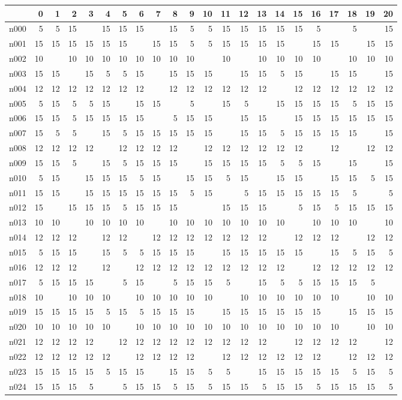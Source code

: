 {\scriptsize
\begin{tabular}{l*{21}{r}} \toprule
& 0& 1& 2& 3& 4& 5& 6& 7& 8& 9& 10& 11& 12& 13& 14& 15& 16& 17& 18& 19& 20\\ \midrule 
n000& 5& 5& 15& & 15& 15& 15& & 15& 5& 5& 15& 15& 15& 15& 15& 5& & 5& & 15\\ 
n001& 15& 15& 15& 15& 15& 15& & 15& 15& 5& 5& 15& 15& 15& 15& & 15& 15& & 15& 15\\ 
n002& 10& & 10& 10& 10& 10& 10& 10& 10& 10& & 10& & 10& 10& 10& 10& & 10& 10& 10\\ 
n003& 15& 15& & 15& 5& 5& 15& & 15& 15& 15& & 15& 15& 5& 15& & 15& 15& & 15\\ 
n004& 12& 12& 12& 12& 12& 12& 12& & 12& 12& 12& 12& 12& 12& & 12& 12& 12& 12& 12& 12\\ 
n005& 5& 15& 5& 5& 15& & 15& 15& & 5& & 15& 5& & 15& 15& 15& 15& 5& 15& 15\\ 
n006& 15& 15& 5& 15& 15& 15& 15& & 5& 15& 15& & 15& 15& & 15& 15& 15& 15& 15& 15\\ 
n007& 15& 5& 5& & 15& 5& 15& 15& 15& 15& 15& & 15& 15& 5& 15& 15& 15& 15& & 15\\ 
n008& 12& 12& 12& 12& & 12& 12& 12& 12& & 12& 12& 12& 12& 12& 12& & 12& & 12& 12\\ 
n009& 15& 15& 5& & 15& 5& 15& 15& 15& & 15& 15& 15& 15& 5& 5& 15& & 15& & 15\\ 
n010& 5& 15& & 15& 15& 15& 5& 15& & 15& 15& 5& 15& & 15& 15& & 15& 15& 5& 15\\ 
n011& 15& 15& & 15& 15& 15& 15& 15& 15& 5& 15& & 5& 15& 15& 15& 15& 15& 5& & 5\\ 
n012& 15& & 15& 15& 15& 5& 15& 15& 15& & & 15& 15& 15& & 5& 15& 5& 15& 15& 15\\ 
n013& 10& 10& & 10& 10& 10& 10& & 10& 10& 10& 10& 10& 10& 10& & 10& 10& 10& & 10\\ 
n014& 12& 12& 12& & 12& 12& & 12& 12& 12& 12& 12& 12& 12& & 12& 12& 12& & 12& 12\\ 
n015& 5& 15& 15& & 15& 5& 5& 15& 15& 15& & 15& 15& 15& 15& 15& & 15& 5& 15& 5\\ 
n016& 12& 12& 12& & 12& & 12& 12& 12& 12& 12& 12& 12& 12& 12& & 12& 12& 12& 12& 12\\ 
n017& 5& 15& 15& 15& & 5& 15& & 5& 15& 15& 5& & 15& 5& 5& 15& 15& 15& 5& \\ 
n018& 10& & 10& 10& 10& & 10& 10& 10& 10& 10& & 10& 10& 10& 10& 10& 10& & 10& 10\\ 
n019& 15& 15& 15& 15& 5& 15& 5& 15& 15& 15& & 15& 15& 15& 15& 15& 15& & 15& 15& 15\\ 
n020& 10& 10& 10& 10& 10& & 10& 10& 10& 10& 10& 10& 10& 10& 10& 10& 10& 10& & 10& 10\\ 
n021& 12& 12& 12& 12& & 12& 12& 12& 12& 12& 12& 12& 12& 12& & 12& 12& 12& 12& & 12\\ 
n022& 12& 12& 12& 12& 12& & 12& 12& 12& 12& & 12& 12& 12& 12& 12& 12& & 12& 12& 12\\ 
n023& 15& 15& 15& 15& 5& 15& 15& & 15& 15& 5& 5& & 15& 15& 15& 15& 15& 5& 15& 5\\ 
n024& 15& 15& 15& 5& & 5& 15& 15& 5& 15& 5& 15& 15& 5& 15& 15& 5& 15& 15& 15& 5\\ 
\bottomrule
\end{tabular}
}
